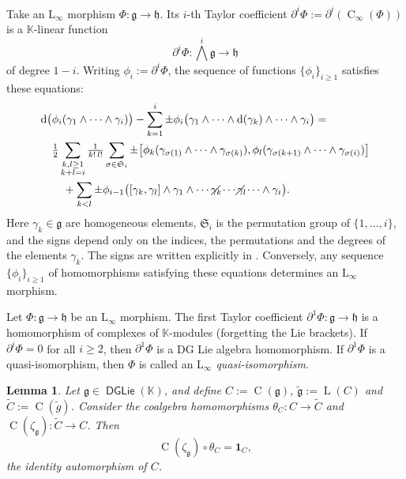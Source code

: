 \documentclass[a4paper,10pt]{amsart}
\newtheorem{lem}[equation]{Lemma}
\theoremstyle{definition}
\numberwithin{equation}{section}
\newcommand{\opn}{\operatorname}
\newcommand{\cat}[1]{\operatorname{\mathsf{#1}}}
\newcommand{\mfrak}[1]{\mathfrak{#1}}
\newcommand{\mrm}[1]{\mathrm{#1}}
\newcommand{\mbb}[1]{\mathbb{#1}}
\newcommand{\smfrac}[2]{\textstyle \frac{#1}{#2}}
\newcommand{\bsym}[1]{\boldsymbol{#1}}
\newcommand{\til}[1]{\tilde{#1}}
\newcommand{\K}{\mbb{K}}
\newcommand{\g}{\mfrak{g}}
\newcommand{\h}{\mfrak{h}}
\newcommand{\bwedge}{{\textstyle \bigwedge}}
\renewcommand{\th}{\theta}
\newcommand{\pa}{\partial}
\begin{document}
Take an $\mrm{L}_{\infty}$ morphism 
$\Phi : \g \to \h$. Its $i$-th Taylor coefficient
$\pa^i \Phi := \pa^i (\opn{C}_{\infty}(\Phi))$ is a $\K$-linear function 
\[ \pa^i \Phi : \bwedge^i \g \to \h \]
of degree $1 - i$. Writing $\phi_i := \pa^i \Phi$, the sequence of 
functions $\{ \phi_i \}_{i \geq 1}$ satisfies these equations:
\[ \begin{aligned}
& \mrm{d} \bigl( \phi_i(\gamma_1 \wedge \cdots 
\wedge \gamma_i) \bigr) - \sum_{k = 1}^i \pm 
\phi_i \bigl( \gamma_1 \wedge \cdots \wedge 
\mrm{d}(\gamma_k) \wedge \cdots \wedge \gamma_i \bigr) = \\
& \quad {\smfrac{1}{2}} \sum_{\substack{k, l \geq 1 \\ k + l = i}}
{\smfrac{1}{k! \, l!}} \sum_{\sigma \in \mfrak{S}_i} \pm
\bigl[ \phi_k (\gamma_{\sigma(1)} \wedge \cdots \wedge 
\gamma_{\sigma(k)}),
\phi_l (\gamma_{\sigma(k + 1)} \wedge \cdots \wedge 
\gamma_{\sigma(i)}) \bigr] \\
& \qquad +
\sum_{k < l} \pm
\phi_{i-1} \bigl( [\gamma_k, \gamma_l] \wedge
\gamma_{1} \wedge \cdots \gamma_k \hspace{-1em} \diagup \cdots
\gamma_l \hspace{-1em} \diagup 
\cdots \wedge \gamma_{i} \bigr) .
\end{aligned} \]
Here $\gamma_k \in \mfrak{g}$ are homogeneous elements,
$\mfrak{S}_i$ is the permutation group of $\{ 1, \ldots, i \}$,
and the signs depend only on the indices, the permutations and the 
degrees of the elements $\gamma_k$. The
signs are written explicitly in \cite[Section 3.6]{CKTB}. 
Conversely, any sequence $\{ \phi_i \}_{i \geq 1}$ of homomorphisms satisfying
these equations determines an $\mrm{L}_{\infty}$ morphism.

Let $\Phi : \g \to \h$ be  an $\mrm{L}_{\infty}$ morphism.
The first Taylor coefficient  $\pa^1 \Phi : \g \to \h$ is a homomorphism of
complexes of $\K$-modules (forgetting the Lie brackets). 
If $\pa^i \Phi = 0$ for all $i \geq 2$, then 
$\pa^1 \Phi$ is a DG Lie algebra homomorphism. 
If $\pa^1 \Phi$ is a quasi-isomorphism, then $\Phi$ is called an 
{\em $\mrm{L}_{\infty}$ quasi-isomorphism}.

\begin{lem} \label{lem:20}
Let $\g \in \cat{DGLie}(\K)$, and define
$C := \opn{C}(\g)$, $\til{\g} := \opn{L}(C)$ and $\til{C} := \opn{C}(\til{g})$.
Consider the coalgebra homomorphisms 
$\th_C : C \to \til{C}$ and $\opn{C}(\zeta_{\g}) : \til{C} \to C$. 
Then 
\[ \opn{C}(\zeta_{\g}) \circ \th_C = \bsym{1}_C , \]
the identity automorphism of $C$.
\end{lem}
\end{document}
